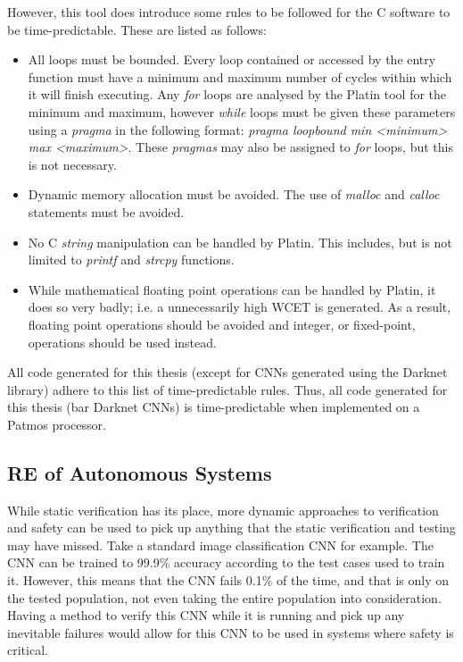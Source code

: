 However, this tool does introduce some rules to be followed for the C software to be time-predictable.
These are listed as follows:
\begin{itemize}
	\item All loops must be bounded. Every loop contained or accessed by the entry function must have a minimum and maximum number of cycles within which it will finish executing. Any \textit{for} loops are analysed by the Platin tool for the minimum and maximum, however \textit{while} loops must be given these parameters using a \textit{pragma} in the following format: \textit{pragma loopbound min <minimum> max <maximum>}. These \textit{pragmas} may also be assigned to \textit{for} loops, but this is not necessary.
	\item Dynamic memory allocation must be avoided. The use of \textit{malloc} and \textit{calloc} statements must be avoided.
	\item No C \textit{string} manipulation can be handled by Platin. This includes, but is not limited to \textit{printf} and \textit{strcpy} functions.
	\item While mathematical floating point operations can be handled by Platin, it does so very badly; i.e. a unnecessarily high \ac{WCET} is generated. As a result, floating point operations should be avoided and integer, or fixed-point, operations should be used instead.
\end{itemize}
All code generated for this thesis (except for \acp{CNN} generated using the Darknet library) adhere to this list of time-predictable rules.
Thus, all code generated for this thesis (bar Darknet \acp{CNN}) is time-predictable when implemented on a Patmos processor.

\subsection{\acf{RE} of Autonomous Systems}
While static verification has its place, more dynamic approaches to verification and safety can be used to pick up anything that the static verification and testing may have missed.
Take a standard image classification \ac{CNN} for example.
The \ac{CNN} can be trained to 99.9\% accuracy according to the test cases used to train it.
However, this means that the \ac{CNN} fails 0.1\% of the time, and that is only on the tested population, not even taking the entire population into consideration.
Having a method to verify this \ac{CNN} while it is running and pick up any inevitable failures would allow for this \ac{CNN} to be used in systems where safety is critical.

